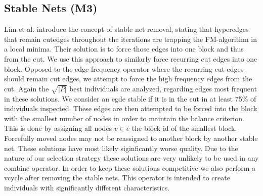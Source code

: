 \documentclass[a4paper,12pt,titlepage, BCOR7mm,headsepline]{scrbook}
\numberwithin{equation}{section}
\begin{document}
\subsection{Stable Nets (M3)}
Lim et al. \cite{lim1997large} introduce the concept of stable net removal, stating that hyperedges that remain cutedges throughout the iterations are trapping the FM-algorithm in a local minima. Their solution is to force those edges into one block and thus from the cut. 
We use this approach to similarly force recurring cut edges into one block. 
Opposed to the edge frequency operator where the recurring cut edges should remain cut edges, we attempt to force the high frequency edges from the cut.
Again the $\sqrt{|P|}$ best individuals are analyzed, regarding edges most frequent in these solutions. We consider an egde stable if it is in the cut in at least 75\% of individuals inspected.
These edges are then attempted to be forced into the block with the smallest number of nodes in order to maintain the balance criterion. This is done by assigning all nodes $ v \in e$ the block id of the smallest block.
Forcefully moved nodes may not be reassigned to another block by another stable net.
These solutions have most likely siginficantly worse quality. Due to the nature of our selection strategy these solutions are very unlikely to be used in any combine operator. In order to keep these solutions competitive we also perform a vcycle after removing the stable nets. This operator is intended to create individuals with significantly different characteristics. 
\end{document}
